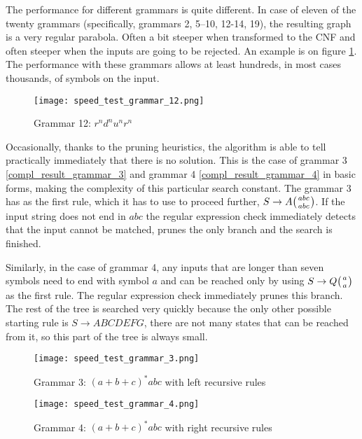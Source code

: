 The performance for different grammars is quite different. In case of eleven of the twenty grammars (specifically, grammars 2, 5--10, 12-14, 19), the resulting graph is a very regular parabola. Often a bit steeper when transformed to the CNF and often steeper when the inputs are going to be rejected. An example is on figure \ref{fig:speed_test_grammar_12}. The performance with these grammars allows at least hundreds, in most cases thousands, of symbols on the input.

\begin{figure}[h!]
  \texttt{[image: speed\_test\_grammar\_12.png]}
  \caption{Grammar 12: $r^n d^n u^n r^n$}
  \label{fig:speed_test_grammar_12}
\end{figure}


Occasionally, thanks to the pruning heuristics, the algorithm is able to tell practically immediately that there is no solution. This is the case of grammar 3 \ref{compl_result_grammar_3} and grammar 4 \ref{compl_result_grammar_4} in basic forms, making the complexity of this particular search constant. The grammar 3 has as the first rule, which it has to use to proceed further, $S \rightarrow A \wkpair{abc}{abc}$. If the input string does not end in $abc$ the regular expression check immediately detects that the input cannot be matched, prunes the only branch and the search is finished.

Similarly, in the case of grammar 4, any inputs that are longer than seven symbols need to end with symbol $a$ and can be reached only by using $S \rightarrow Q \wkpair{a}{a}$ as the first rule. The regular expression check immediately prunes this branch. The rest of the tree is searched very quickly because the only other possible starting rule is $S \rightarrow A B C D E F G$, there are not many states that can be reached from it, so this part of the tree is always small.

\begin{figure}[h!]
  \texttt{[image: speed\_test\_grammar\_3.png]}
  \caption{Grammar 3: $(a+b+c)^*abc$ with left recursive rules}
  \label{fig:speed_test_grammar_3}
\end{figure}

\begin{figure}[h!]
  \texttt{[image: speed\_test\_grammar\_4.png]}
  \caption{Grammar 4: $(a+b+c)^*abc$ with right recursive rules}
  \label{fig:speed_test_grammar_4}
\end{figure}

